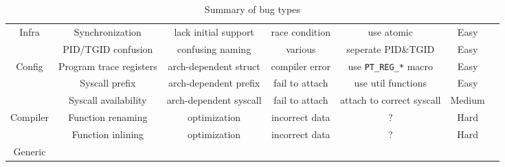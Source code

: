 \begin{table*}
\begin{tabular}{c|c|c|c|c|c|c}
    \hline
    \multirow{2}{*}{Infra}
                                 & Synchronization         & lack initial support   & race condition & use atomic                    & Easy       &      \\ \cline{2-7}
                                 & PID/TGID confusion      & confusing naming       & various        & seperate PID\&TGID            & Easy       &      \\
    \hline
    \multirow{3}{*}{Config}
                                 & Program trace registers & arch-dependent struct  & compiler error & use \texttt{PT\_REG\_*} macro & Easy       &      \\ \cline{2-7}
                                 & Syscall prefix          & arch-dependent prefix  & fail to attach & use util functions            & Easy       &      \\ \cline{2-7}
                                 & Syscall availability    & arch-dependent syscall & fail to attach & attach to correct syscall     & Medium     &      \\
    \hline
    \multirow{2}{*}{Compiler}
                                 & Function renaming       & optimization           & incorrect data & ?                             & Hard       &      \\ \cline{2-7}
                                 & Function inlining       & optimization           & incorrect data & ?                             & Hard       &      \\
    \hline
    Generic                      &                         &                        &                &                               &            &      \\
  \end{tabular}
  \caption{Summary of bug types}
  \label{tab:bug_types}
\end{table*}


